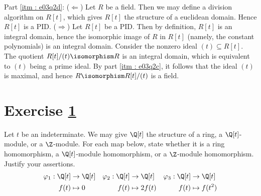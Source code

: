 {Part \ref{itm : e03q2d}: ($\Leftarrow$) Let $R$ be a field. Then we may define a division algorithm on $R[t]$, which gives $R[t]$ the structure of a euclidean domain. Hence $R[t]$ is a PID. ($\Rightarrow$) Let $R[t]$ be a PID. Then by definition, $R[t]$ is an integral domain, hence the isomorphic image of $R$ in $R[t]$ (namely, the constant polynomials) is an integral domain. Consider the nonzero ideal $(t) \subseteq R[t]$. The quotient $R[t] / (t) \isomorphism R$ is an integral domain, which is equivalent to $(t)$ being a prime ideal. By part \ref{itm : e03q2c}, it follows that the ideal $(t)$ is maximal, and hence $R \isomorphism R[t] / (t)$ is a field.}%



\section{Exercise \ref{sec : e03q3}}
\label{sec : e03q3}

\noindent{}Let $t$ be an indeterminate. We may give $\Q[t]$ the structure of a ring, a $\Q[t]$-module, or a $\Z$-module. For each map below, state whether it is a ring homomorphism, a $\Q[t]$-module homomorphism, or a $\Z$-module homomorphism. Justify your assertions. 
\begin{align*}
\varphi_{1}
:
\Q[t]
&\rightarrow
\Q[t]
&
\varphi_{2}
:
\Q[t]
&\rightarrow
\Q[t]
&
\varphi_{3}
:
\Q[t]
&\rightarrow
\Q[t]
\\
f(t)
&\mapsto
0
&
f(t)
&\mapsto
2 f(t)
&
f(t)
&\mapsto
f(t^{2})
\end{align*}

